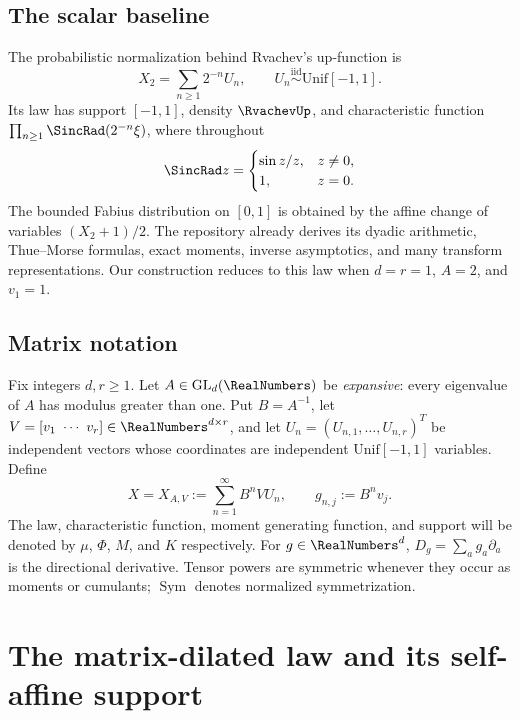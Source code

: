 \documentclass[11pt,oneside]{article}
\theoremstyle{definition}
\theoremstyle{remark}
\newcommand{\Sym}{\operatorname{Sym}}
\begin{document}
\subsection{The scalar baseline}

The probabilistic normalization behind Rvachev's up-function is
\[
 X_2=\sum_{n\ge1}2^{-n}U_n,
 \qquad U_n\stackrel{\mathrm{iid}}\sim\mathrm{Unif}[-1,1].
\]
Its law has support $[-1,1]$, density $\RvachevUp$, and characteristic function
$\prod_{n\ge1}\SincRad(2^{-n}\xi)$, where throughout
\[
 \SincRad z=\begin{cases}\sin z/z,&z\ne0,\\1,&z=0.\end{cases}
\]
The bounded Fabius distribution on $[0,1]$ is obtained by the affine change of
variables $(X_2+1)/2$.  The repository already derives its dyadic arithmetic,
Thue--Morse formulas, exact moments, inverse asymptotics, and many transform
representations.  Our construction reduces to this law when $d=r=1$, $A=2$,
and $v_1=1$.

\subsection{Matrix notation}

Fix integers $d,r\ge1$.  Let $A\in\mathrm{GL}_d(\RealNumbers)$ be \emph{expansive}:
every eigenvalue of $A$ has modulus greater than one.  Put $B=A^{-1}$, let
$V=[v_1\ \cdots\ v_r]\in\RealNumbers^{d\times r}$, and let
$U_n=(U_{n,1},\ldots,U_{n,r})^T$ be independent vectors whose coordinates are
independent $\mathrm{Unif}[-1,1]$ variables.  Define
\begin{equation}
 X=X_{A,V}:=\sum_{n=1}^{\infty}B^nVU_n,
 \qquad g_{n,j}:=B^nv_j.
 \label{eq:defX}
\end{equation}
The law, characteristic function, moment generating function, and support will
be denoted by $\mu$, $\Phi$, $M$, and $K$ respectively.  For $g\in\RealNumbers^d$,
$D_g=\sum_a g_a\partial_a$ is the directional derivative.  Tensor powers are
symmetric whenever they occur as moments or cumulants; $\Sym$ denotes normalized
symmetrization.

\section{The matrix-dilated law and its self-affine support}
\label{sec:construction}
\end{document}
